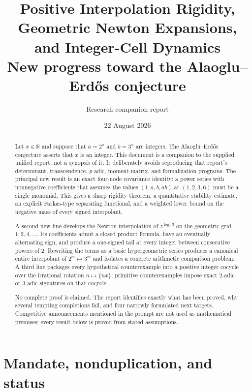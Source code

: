 \documentclass[11pt]{article}
\title{\textbf{Positive Interpolation Rigidity, Geometric Newton Expansions, and Integer-Cell Dynamics}\\[0.4em]
\large New progress toward the Alaoglu--Erd\H{o}s conjecture}
\author{Research companion report}
\date{22 August 2026}
\theoremstyle{definition}
\newcommand{\R}{\mathbb R}
\begin{document}
\maketitle

\begin{abstract}
Let $x\in\R$ and suppose that $a=2^x$ and $b=3^x$ are integers.  The Alaoglu--Erd\H{o}s conjecture asserts that $x$ is an integer.  This document is a companion to the supplied unified report, not a synopsis of it.  It deliberately avoids reproducing that report's determinant, transcendence, $p$-adic, moment-matrix, and formalization programs.  The principal new result is an exact four-node covariance identity: a power series with nonnegative coefficients that assumes the values $(1,a,b,ab)$ at $(1,2,3,6)$ must be a single monomial.  This gives a sharp rigidity theorem, a quantitative stability estimate, an explicit Farkas-type separating functional, and a weighted lower bound on the negative mass of every signed interpolant.

A second new line develops the Newton interpolation of $z^{\log_2 3}$ on the geometric grid $1,2,4,\dots$.  Its coefficients admit a closed product formula, have an eventually alternating sign, and produce a one-signed tail at every integer between consecutive powers of $2$.  Rewriting the terms as a basic hypergeometric series produces a canonical entire interpolant of $2^m\mapsto 3^m$ and isolates a concrete arithmetic comparison problem.  A third line packages every hypothetical counterexample into a positive integer cocycle over the irrational rotation $n\mapsto\{nx\}$; primitive counterexamples impose exact $2$-adic or $3$-adic signatures on that cocycle.

No complete proof is claimed.  The report identifies exactly what has been proved, why several tempting completions fail, and four narrowly formulated next targets.  Competitive announcements mentioned in the prompt are not used as mathematical premises; every result below is proved from stated assumptions.
\end{abstract}

\tableofcontents
\newpage

\section{Mandate, nonduplication, and status}
\end{document}
